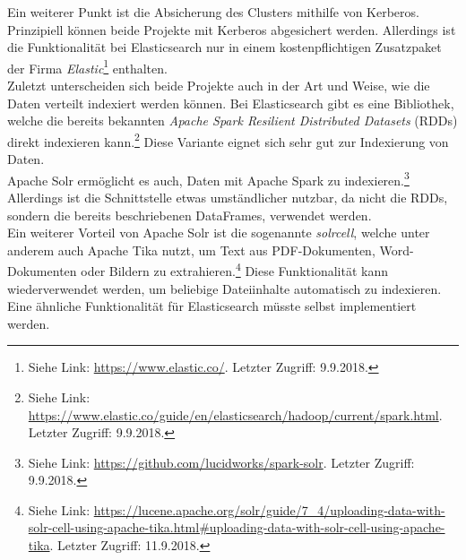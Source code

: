 \noindent
Ein weiterer Punkt ist die Absicherung des Clusters mithilfe von Kerberos. Prinzipiell können beide Projekte mit Kerberos abgesichert werden. Allerdings ist die Funktionalität bei Elasticsearch nur in einem kostenpflichtigen Zusatzpaket der Firma \textit{Elastic}\footnote{Siehe Link: \url{https://www.elastic.co/}. Letzter Zugriff: 9.9.2018.} enthalten.\\

\noindent
Zuletzt unterscheiden sich beide Projekte auch in der Art und Weise, wie die Daten verteilt indexiert werden können. Bei Elasticsearch gibt es eine Bibliothek, welche die bereits bekannten \textit{Apache Spark Resilient Distributed Datasets} (RDDs) direkt indexieren kann.\footnote{Siehe Link: \url{https://www.elastic.co/guide/en/elasticsearch/hadoop/current/spark.html}. Letzter Zugriff: 9.9.2018.} Diese Variante eignet sich sehr gut zur Indexierung von Daten.\\
Apache Solr ermöglicht es auch, Daten mit Apache Spark zu indexieren.\footnote{Siehe Link: \url{https://github.com/lucidworks/spark-solr}. Letzter Zugriff: 9.9.2018.} Allerdings ist die Schnittstelle etwas umständlicher nutzbar, da nicht die RDDs, sondern die bereits beschriebenen DataFrames, verwendet werden.\\

\noindent
Ein weiterer Vorteil von Apache Solr ist die sogenannte \textit{\gls{solrcell}}, welche unter anderem auch Apache Tika nutzt, um Text aus PDF-Dokumenten, Word-Dokumenten oder Bildern zu extrahieren.\footnote{Siehe Link: \url{https://lucene.apache.org/solr/guide/7_4/uploading-data-with-solr-cell-using-apache-tika.html\#uploading-data-with-solr-cell-using-apache-tika}. Letzter Zugriff: 11.9.2018.} Diese Funktionalität kann wiederverwendet werden, um beliebige Dateiinhalte automatisch zu indexieren. Eine ähnliche Funktionalität für Elasticsearch müsste selbst implementiert werden.\\

